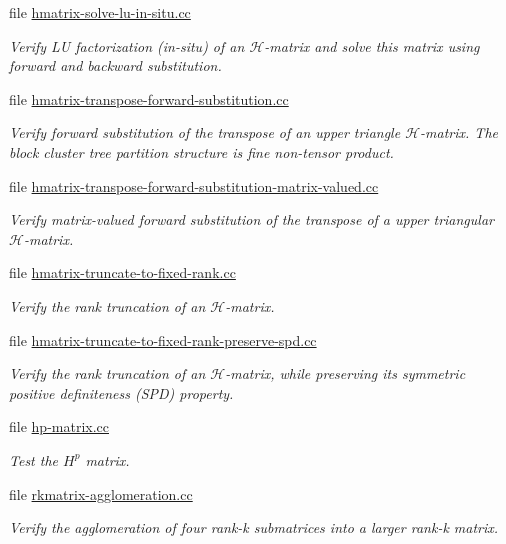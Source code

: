 \begin{DoxyCompactItemize}
file \hyperlink{hmatrix-solve-lu-in-situ_8cc}{hmatrix-\/solve-\/lu-\/in-\/situ.\+cc}
\begin{DoxyCompactList}\small\item\em Verify LU factorization (in-\/situ) of an $\mathcal{H}$-\/matrix and solve this matrix using forward and backward substitution. \end{DoxyCompactList}\item 
file \hyperlink{hmatrix-transpose-forward-substitution_8cc}{hmatrix-\/transpose-\/forward-\/substitution.\+cc}
\begin{DoxyCompactList}\small\item\em Verify forward substitution of the transpose of an upper triangle $\mathcal{H}$-\/matrix. The block cluster tree partition structure is fine non-\/tensor product. \end{DoxyCompactList}\item 
file \hyperlink{hmatrix-transpose-forward-substitution-matrix-valued_8cc}{hmatrix-\/transpose-\/forward-\/substitution-\/matrix-\/valued.\+cc}
\begin{DoxyCompactList}\small\item\em Verify matrix-\/valued forward substitution of the transpose of a upper triangular $\mathcal{H}$-\/matrix. \end{DoxyCompactList}\item 
file \hyperlink{hmatrix-truncate-to-fixed-rank_8cc}{hmatrix-\/truncate-\/to-\/fixed-\/rank.\+cc}
\begin{DoxyCompactList}\small\item\em Verify the rank truncation of an $\mathcal{H}$-\/matrix. \end{DoxyCompactList}\item 
file \hyperlink{hmatrix-truncate-to-fixed-rank-preserve-spd_8cc}{hmatrix-\/truncate-\/to-\/fixed-\/rank-\/preserve-\/spd.\+cc}
\begin{DoxyCompactList}\small\item\em Verify the rank truncation of an $\mathcal{H}$-\/matrix, while preserving its symmetric positive definiteness (S\+PD) property. \end{DoxyCompactList}\item 
file \hyperlink{hp-matrix_8cc}{hp-\/matrix.\+cc}
\begin{DoxyCompactList}\small\item\em Test the $H^p$ matrix. \end{DoxyCompactList}\item 
file \hyperlink{rkmatrix-agglomeration_8cc}{rkmatrix-\/agglomeration.\+cc}
\begin{DoxyCompactList}\small\item\em Verify the agglomeration of four rank-\/k submatrices into a larger rank-\/k matrix. \end{DoxyCompactList}\end{DoxyCompactItemize}
